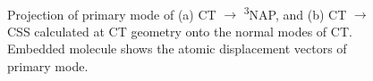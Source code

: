 \begin{figure}[!h]
\\
\caption{
Projection of primary mode of (a) CT $\rightarrow$ \textsuperscript{3}NAP, and (b) CT $\rightarrow$ CSS calculated at CT geometry onto the normal modes of CT. Embedded molecule shows the atomic displacement vectors of primary mode.
}\label{projT3}
\end{figure}


